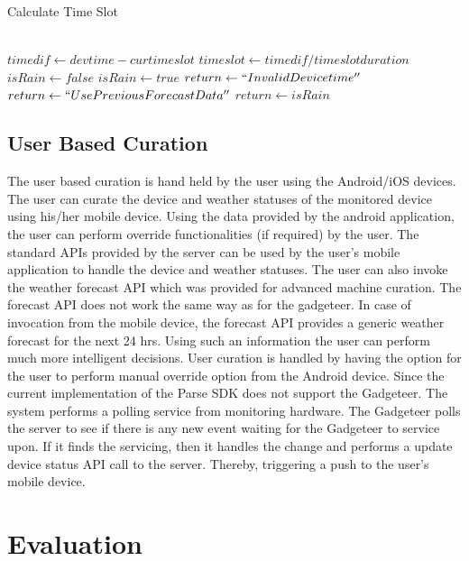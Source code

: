 \documentclass[10pt]{article}
\begin{document}
\begin{algorithm}
\caption{Calculate Time Slot}          %
\label{time_alg}      
\begin{algorithmic}
\\
\State $timedif \gets devtime - curtimeslot$
    \State $timeslot\gets timedif/timeslotduration$
        		\State $isRain \gets false$
    		\Else
    			\State $isRain \gets true$
    		\EndIf
    \Else
    		\State $return \gets ``Invalid Device time''$
    \EndIf
\Else
    \State $return \gets ``Use Previous Forecast Data''$
\EndIf
\State $return \gets isRain$
\end{algorithmic}
\end{algorithm} 

\subsection*{User Based Curation}

The user based curation is hand held by the user using the Android/iOS devices. 
The user can curate the device and weather statuses of the monitored device using his/her mobile device.
Using the data provided by the android application, the user can perform override functionalities (if required) by the user.
The standard APIs provided by the server can be used by the user's mobile application to handle the device and weather statuses.
The user can also invoke the weather forecast API which was provided for advanced machine curation.
The forecast API does not work the same way as for the gadgeteer. 
In case of invocation from the mobile device, the forecast API provides a generic weather forecast for the next 24 hrs. 
Using such an information the user can perform much more intelligent decisions.
User curation is handled by having the option for the user to perform manual override option from the Android device.
Since the current implementation of the Parse SDK does not support the Gadgeteer.
The system performs a polling service from monitoring hardware. 
The Gadgeteer polls the server to see if there is any new event waiting for the Gadgeteer to service upon.
If it finds the servicing, then it handles the change and performs a update device status API call to the server. 
Thereby, triggering a push to the user's mobile device.

\section*{Evaluation}
\end{document}
